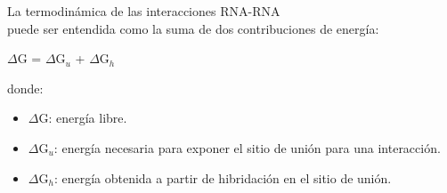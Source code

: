 \par La termodinámica de las interacciones RNA-RNA \\
\cite{freeEnergy} puede ser entendida como la suma de dos contribuciones de energía:
\begin{center}
	$\Delta$G = $\Delta$G$_u$ + $\Delta$G$_h$ 
\end{center}
donde:
\begin{itemize}
	\item $\Delta$G: energía libre.
	\item $\Delta$G$_u$: energía necesaria para exponer el sitio de unión para una interacción. 
	\item $\Delta$G$_h$: energía obtenida a partir de hibridación en el sitio de unión.
\end{itemize}